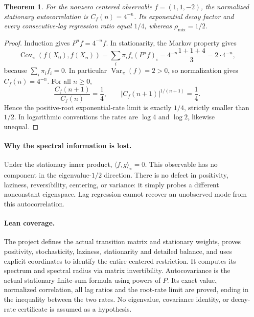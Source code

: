 \documentclass[11pt]{article}
\newtheorem{theorem}{Theorem}
\begin{document}
\begin{theorem}
For the nonzero centered observable $f=(1,1,-2)$, the normalized stationary
autocorrelation is $C_f(n)=4^{-n}$. Its exponential decay factor and every
consecutive-lag regression ratio equal $1/4$, whereas
$\rho_{\mathrm{mix}}=1/2$.
\end{theorem}
\begin{proof}
Induction gives $P^nf=4^{-n}f$. In stationarity, the Markov property gives
\[
 \operatorname{Cov}_\pi(f(X_0),f(X_n))
   =\sum_i\pi_i f_i(P^nf)_i
   =4^{-n}\frac{1+1+4}{3}=2\cdot4^{-n},
\]
because $\sum_i\pi_i f_i=0$. In particular $\operatorname{Var}_\pi(f)=2>0$,
so normalization gives $C_f(n)=4^{-n}$. For all $n\geq0$,
\[
 \frac{C_f(n+1)}{C_f(n)}=\frac14,\qquad
 |C_f(n+1)|^{1/(n+1)}=\frac14.
\]
Hence the positive-root exponential-rate limit is exactly $1/4$,
strictly smaller than $1/2$. In logarithmic conventions the rates are
$\log4$ and $\log2$, likewise unequal.
\end{proof}

\paragraph{Why the spectral information is lost.}
Under the stationary inner product, $\langle f,g\rangle_\pi=0$.
This observable has no component in the eigenvalue-$1/2$ direction.
There is no defect in positivity, laziness, reversibility, centering, or
variance: it simply probes a different nonconstant eigenspace.
Lag regression cannot recover an unobserved mode from this autocorrelation.

\paragraph{Lean coverage.}
The project defines the actual transition matrix and stationary weights,
proves positivity, stochasticity, laziness, stationarity and detailed
balance, and uses explicit coordinates to identify the entire centered
restriction. It computes its spectrum and spectral radius via matrix
invertibility. Autocovariance is the actual stationary finite-sum formula
using powers of $P$. Its exact value, normalized correlation, all lag
ratios and the root-rate limit are proved, ending in the inequality
between the two rates. No eigenvalue, covariance identity, or decay-rate
certificate is assumed as a hypothesis.
\end{document}

